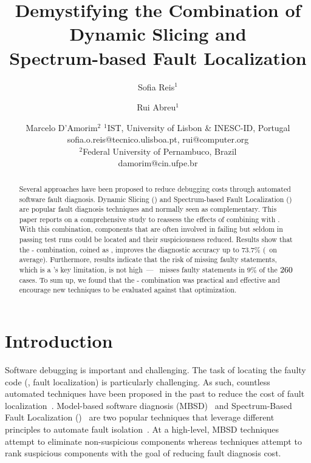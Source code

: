 \documentclass{article}
\title{Demystifying the Combination of Dynamic Slicing and \\ Spectrum-based Fault
Localization}
\author{
Sofia Reis$^1$
\and
Rui Abreu$^1$\and
Marcelo D'Amorim$^2$\affiliations
$^1$IST, University of Lisbon \& INESC-ID, Portugal\\
\emails
sofia.o.reis@tecnico.ulisboa.pt,
rui@computer.org\\
$^2$Federal University of Pernambuco, Brazil\\
\emails
damorim@cin.ufpe.br
}
\begin{document}
\maketitle

\begin{abstract}
Several approaches have been proposed to reduce debugging costs through
automated software fault diagnosis.  Dynamic Slicing (\ds{}) and Spectrum-based
Fault Localization (\sfl{}) are popular fault diagnosis techniques and normally
seen as complementary. This paper reports on a comprehensive
study to reassess the effects of combining \ds{} with \sfl{}.  With this
combination, components that are often involved in failing but seldom in passing
test runs could be located and their suspiciousness reduced. Results show that
the \ds{}-\sfl{} combination, coined as \comb, improves the diagnostic
accuracy up to $73.7\%$ (\avgImprov\ on average). Furthermore, results indicate
that the risk of missing faulty statements, which is a \ds{}'s key limitation,
is not high~---~\ds{} misses faulty statements in $9\%$
of the $\numFaults{}$ cases. To sum up, we found that the \ds{}-\sfl{} combination
was practical and effective and encourage new \sfl{} techniques to be evaluated
against that optimization.
\end{abstract}

\section{Introduction}

Software debugging is important and challenging. The task of locating
the faulty code (\ie{}, fault localization) is particularly
challenging. As such, countless automated techniques have been
proposed in the past to reduce the cost of fault
localization~\cite{7390282}. Model-based software diagnosis
(MBSD)~\cite{REITER198757,DEKLEER200325} and Spectrum-Based Fault
Localization (\sfl{})~\cite{DBLP:journals/stvr/HarroldRSWY00} are two
popular techniques that leverage different principles to automate
fault isolation~\cite{DBLP:conf/sac/AbreuGZG08}.  At a high-level,
MBSD
techniques~\cite{wotawa2002model,Mayer:2008:EMM:1642931.1642950,mayer2008prioritising,Perez:2018:LQR:3304889.3304927,Ko:2008:DRA:1368088.1368130}
attempt to eliminate non-suspicious components whereas \sfl{}
techniques attempt to rank suspicious components with the goal of
reducing fault diagnosis cost.
\end{document}
